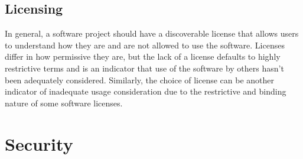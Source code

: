 \documentclass{article}
\begin{document}
\subsection{Licensing}
In general, a software project should have a discoverable license that allows users to understand how they are and are not allowed to use the software. Licenses differ in how permissive they are, but the lack of a license defaults to highly restrictive terms and is an indicator that use of the software by others hasn’t been adequately considered. Similarly, the choice of license can be another indicator of inadequate usage consideration due to the restrictive and binding nature of some software licenses. 


\section{Security}
\label{sec-supp-note-sec}
\end{document}
